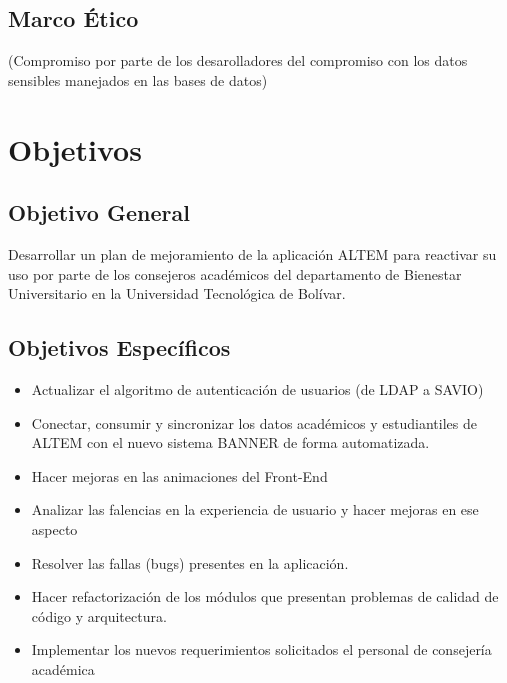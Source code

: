 \subsection{Marco Ético}
(Compromiso por parte de los desarolladores del compromiso con los datos sensibles manejados en las bases de datos)
\section{Objetivos}

\subsection{Objetivo General}
Desarrollar un plan de mejoramiento de la aplicación ALTEM para reactivar su uso por parte de los consejeros académicos del departamento de Bienestar Universitario en la Universidad Tecnológica de Bolívar.

\subsection{Objetivos Específicos}
\begin{itemize}
    \item Actualizar el algoritmo de autenticación de usuarios (de LDAP a SAVIO)
    \item Conectar, consumir y sincronizar los datos académicos y estudiantiles de ALTEM con el nuevo sistema BANNER de forma automatizada.
    \item Hacer mejoras en las animaciones del Front-End
    \item Analizar las falencias en la experiencia de usuario y hacer mejoras en ese aspecto
    \item Resolver las fallas (bugs) presentes en la aplicación.
    \item Hacer refactorización de los módulos que presentan problemas de calidad de código y arquitectura.
    \item Implementar los nuevos requerimientos solicitados el personal de consejería académica
\end{itemize}